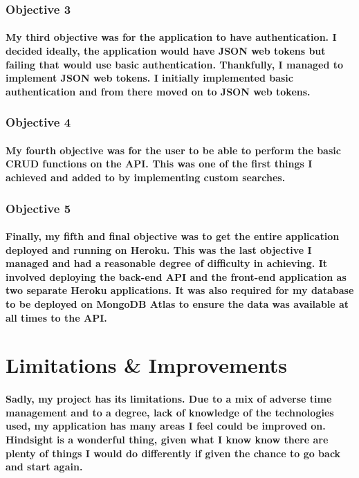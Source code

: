\subsubsection{Objective 3}
\paragraph{My third objective was for the application to have authentication. I decided ideally, the application would have JSON web tokens but failing that would use basic authentication. Thankfully, I managed to implement JSON web tokens. I initially implemented basic authentication and from there moved on to JSON web tokens.}

\subsubsection{Objective 4}
\paragraph{My fourth objective was for the user to be able to perform the basic CRUD functions on the API. This was one of the first things I achieved and added to by implementing custom searches.}

\subsubsection{Objective 5}
\paragraph{Finally, my fifth and final objective was to get the entire application deployed and running on Heroku. This was the last objective I managed and had a reasonable degree of difficulty in achieving. It involved deploying the back-end API and the front-end application as two separate Heroku applications. It was also required for my database to be deployed on MongoDB Atlas to ensure the data was available at all times to the API.}

\section{Limitations \& Improvements}
\paragraph{Sadly, my project has its limitations. Due to a mix of adverse time management and to a degree, lack of knowledge of the technologies used, my application has many areas I feel could be improved on. Hindsight is a wonderful thing, given what I know know there are plenty of things I would do differently if given the chance to go back and start again.}
